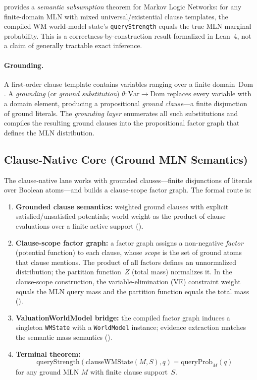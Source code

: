 \documentclass[11pt,openany]{report}
\begin{document}
\xiPLN{} provides a \emph{semantic subsumption} theorem for Markov Logic
Networks: for any finite-domain MLN with mixed universal/existential
clause templates, the compiled WM world-model state's
\texttt{queryStrength} equals the true MLN marginal probability.  This is
a correctness-by-construction result formalized in Lean~4, not a claim of
generally tractable exact inference.

\paragraph{Grounding.}
A first-order clause template contains variables ranging over a finite
domain~$\mathrm{Dom}$.  A \emph{grounding} (or \emph{ground
substitution}) $\theta : \mathrm{Var} \to \mathrm{Dom}$ replaces every
variable with a domain element, producing a propositional \emph{ground
clause}---a finite disjunction of ground literals.  The
\emph{grounding layer} enumerates all such substitutions and compiles
the resulting ground clauses into the propositional factor graph that
defines the MLN distribution.

\subsection{Clause-Native Core (Ground MLN Semantics)}

The clause-native lane works with grounded clauses---finite disjunctions
of literals over Boolean atoms---and builds a clause-scope factor graph.
The formal route is:
\begin{enumerate}
\item \textbf{Grounded clause semantics:} weighted ground clauses with
  explicit satisfied/unsatisfied potentials; world weight as the product
  of clause evaluations over a finite active support
  ().
\item \textbf{Clause-scope factor graph:} a factor graph assigns a
  non-negative \emph{factor} (potential function) to each clause, whose
  \emph{scope} is the set of ground atoms that clause mentions.  The
  product of all factors defines an unnormalized distribution; the
  partition function~$Z$ (total mass) normalizes it.  In the
  clause-scope construction, the variable-elimination (VE) constraint
  weight equals the MLN query mass and the partition function equals
  the total mass
  ().
\item \textbf{ValuationWorldModel bridge:} the compiled factor graph
  induces a singleton \texttt{WMState} with a \texttt{WorldModel} instance;
  evidence extraction matches the semantic mass semantics
  ().
\item \textbf{Terminal theorem:}
  \[
    \mathrm{queryStrength}(\mathrm{clauseWMState}(M, S), q)
      = \mathrm{queryProb}_{M}(q)
  \]
  for any ground MLN $M$ with finite clause support~$S$.
\end{enumerate}
\end{document}

